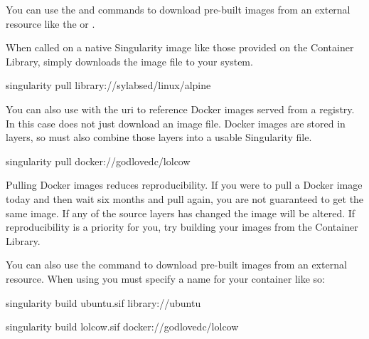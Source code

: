 \documentclass[letterpaper,10pt,english]{sphinxmanual}
\begin{document}
You can use the  and 
commands to download pre-built images from an external resource like the
 or
.

When called on a native Singularity image like those provided on the Container
Library,  simply downloads the image file to your system.

%
\begin{sphinxVerbatim}[commandchars=\\\{\}]
\PYGZdl{} singularity pull library://sylabsed/linux/alpine
\end{sphinxVerbatim}

You can also use  with the  uri to reference Docker images
served from a registry. In this case  does not just download an image
file. Docker images are stored in layers, so  must also combine those
layers into a usable Singularity file.

%
\begin{sphinxVerbatim}[commandchars=\\\{\}]
\PYGZdl{} singularity pull docker://godlovedc/lolcow
\end{sphinxVerbatim}

Pulling Docker images reduces reproducibility. If you were to pull a Docker
image today and then wait six months and pull again, you are not guaranteed to
get the same image. If any of the source layers has changed the image will be
altered. If reproducibility is a priority for you, try building your images from
the Container Library.

You can also use the  command to download pre-built images from an
external resource. When using  you must specify a name for your
container like so:

%
\begin{sphinxVerbatim}[commandchars=\\\{\}]
\PYGZdl{} singularity build ubuntu.sif library://ubuntu

\PYGZdl{} singularity build lolcow.sif docker://godlovedc/lolcow
\end{sphinxVerbatim}
\end{document}
